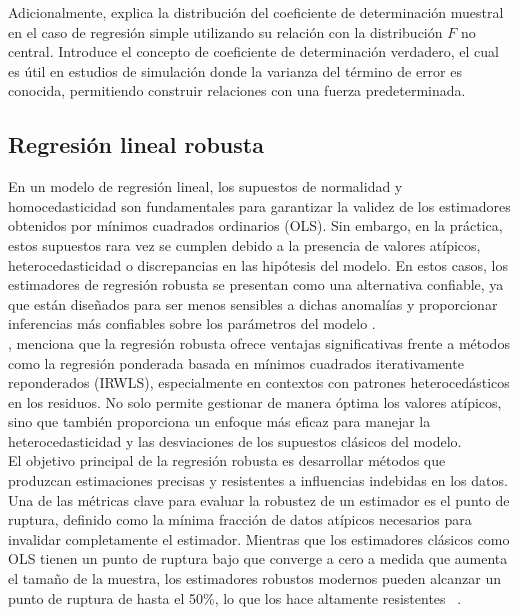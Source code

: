 Adicionalmente, \textcite{christou-2005} explica la distribución del coeficiente de determinación muestral en el caso de regresión simple utilizando su relación con la distribución \(F\) no central. Introduce el concepto de coeficiente de determinación verdadero, el cual es útil en estudios de simulación donde la varianza del término de error es conocida, permitiendo construir relaciones con una fuerza predeterminada.\\







\subsection{Regresión lineal robusta}
En un modelo de regresión lineal, los supuestos de normalidad y homocedasticidad son fundamentales para garantizar la validez de los estimadores obtenidos por mínimos cuadrados ordinarios (OLS). Sin embargo, en la práctica, estos supuestos rara vez se cumplen debido a la presencia de valores atípicos, heterocedasticidad o discrepancias en las hipótesis del modelo. En estos casos, los estimadores de regresión robusta se presentan como una alternativa confiable, ya que están diseñados para ser menos sensibles a dichas anomalías y proporcionar inferencias más confiables sobre los parámetros del modelo \parencite{zacarias-2023}.\\

\textcite{annalisa-2024}, menciona que la regresión robusta ofrece ventajas significativas frente a métodos como la regresión ponderada basada en mínimos cuadrados iterativamente reponderados (IRWLS), especialmente en contextos con patrones heterocedásticos en los residuos. No solo permite gestionar de manera óptima los valores atípicos, sino que también proporciona un enfoque más eficaz para manejar la heterocedasticidad y las desviaciones de los supuestos clásicos del modelo.\\


El objetivo principal de la regresión robusta es desarrollar métodos que produzcan estimaciones precisas y resistentes a influencias indebidas en los datos. Una de las métricas clave para evaluar la robustez de un estimador es el punto de ruptura, definido como la mínima fracción de datos atípicos necesarios para invalidar completamente el estimador. Mientras que los estimadores clásicos como OLS tienen un punto de ruptura bajo que converge a cero a medida que aumenta el tamaño de la muestra, los estimadores robustos modernos pueden alcanzar un punto de ruptura de hasta el 50\%, lo que los hace altamente resistentes ~\parencites{siegel-1982,rousseeuw-1984}. \\

